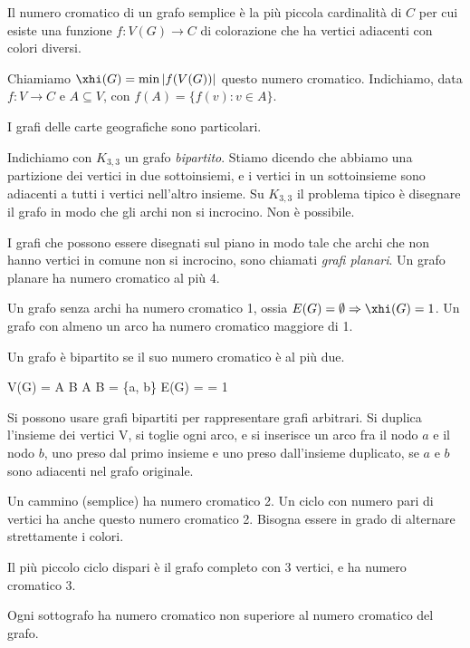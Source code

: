 \begin{defn}
	Il numero cromatico di un grafo semplice \`e la pi\`u piccola cardinalit\`a di $C$ per cui esiste una funzione $f : V(G) \to C$ di colorazione che ha vertici adiacenti con colori diversi.
\end{defn}

Chiamiamo $\xhi(G) = \min \abs{f(V(G))}$ questo numero cromatico.
Indichiamo, data $f : V \to C$ e $A \subseteq V$, con $f(A) = \{ f(v) : v \in A \}$.

I grafi delle carte geografiche sono particolari.

Indichiamo con $K_{3,3}$ un grafo \emph{bipartito}.
Stiamo dicendo che abbiamo una partizione dei vertici in due sottoinsiemi, e i vertici in un sottoinsieme sono adiacenti a tutti i vertici nell'altro insieme.
Su $K_{3,3}$ il problema tipico \`e disegnare il grafo in modo che gli archi non si incrocino.
Non \`e possibile.

I grafi che possono essere disegnati sul piano in modo tale che archi che non hanno vertici in comune non si incrocino, sono chiamati \emph{grafi planari}.
Un grafo planare ha numero cromatico al pi\`u 4.

Un grafo senza archi ha numero cromatico 1, ossia $E(G) = \emptyset \implies \xhi(G) = 1$.
Un grafo con almeno un arco ha numero cromatico maggiore di 1.

\begin{defn}
Un grafo \`e  bipartito se il suo numero cromatico \`e al pi\`u due.
\end{defn}

V(G) = A \cup B
A \cap B = \emptyset
\forall \{a, b\} \in E(G)  =  = 1

Si possono usare grafi bipartiti per rappresentare grafi arbitrari.
Si duplica l'insieme dei vertici V, si toglie ogni arco, e si inserisce un arco fra il nodo $a$ e il nodo $b$, uno preso dal primo insieme e uno preso dall'insieme duplicato, se $a$ e $b$ sono adiacenti nel grafo originale.

Un cammino (semplice) ha numero cromatico 2.
Un ciclo con numero pari di vertici ha anche questo numero cromatico 2.
Bisogna essere in grado di alternare strettamente i colori.

Il pi\`u piccolo ciclo dispari \`e il grafo completo con 3 vertici, e ha numero cromatico 3.

Ogni sottografo ha numero cromatico non superiore al numero cromatico del grafo.

